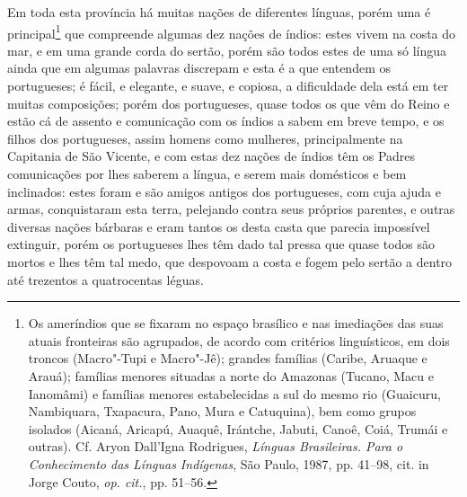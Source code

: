  Em toda esta província há muitas nações de diferentes línguas, porém
uma é principal\footnote{ Os ameríndios que se fixaram no espaço
brasílico e nas imediações das suas atuais fronteiras são agrupados,
de acordo com critérios linguísticos, em dois troncos (Macro"-Tupi e
Macro"-Jê); grandes famílias (Caribe, Aruaque e Arauá); famílias menores
situadas a norte do Amazonas (Tucano, Macu e Ianomâmi) e famílias
menores estabelecidas a sul do mesmo rio (Guaicuru, Nambiquara,
Txapacura, Pano, Mura e Catuquina), bem como grupos isolados (Aicaná,
Aricapú, Auaquê, Irántche, Jabuti, Canoê, Coiá, Trumái e outras). Cf.
Aryon Dall'Igna Rodrigues, \textit{Línguas Brasileiras. Para o
Conhecimento das Línguas Indígenas}, São Paulo, 1987, pp. 41--98, cit.
in Jorge Couto, \textit{op. cit.}, pp. 51--56.} que compreende algumas
dez nações de índios: estes vivem na costa do mar, e em uma grande
corda do sertão, porém são todos estes de uma só língua ainda que em
algumas palavras discrepam e esta é a que entendem os portugueses; é
fácil, e elegante, e suave, e copiosa, a dificuldade dela está em ter
muitas composições; porém dos portugueses, quase todos os que vêm do
Reino e estão cá de assento e comunicação com os índios a sabem em
breve tempo, e os filhos dos portugueses, assim homens como mulheres,
principalmente na Capitania de São Vicente, e com estas dez nações de
índios têm os Padres comunicações por lhes saberem a língua, e serem
mais domésticos e bem inclinados: estes foram e são amigos antigos dos
portugueses, com cuja ajuda e armas, conquistaram esta terra, pelejando
contra seus próprios parentes, e outras diversas nações bárbaras e eram
tantos os desta casta que parecia impossível extinguir, porém os
portugueses lhes têm dado tal pressa que quase todos são mortos e lhes
têm tal medo, que despovoam a costa e fogem pelo sertão a dentro até
trezentos a quatrocentas léguas.

